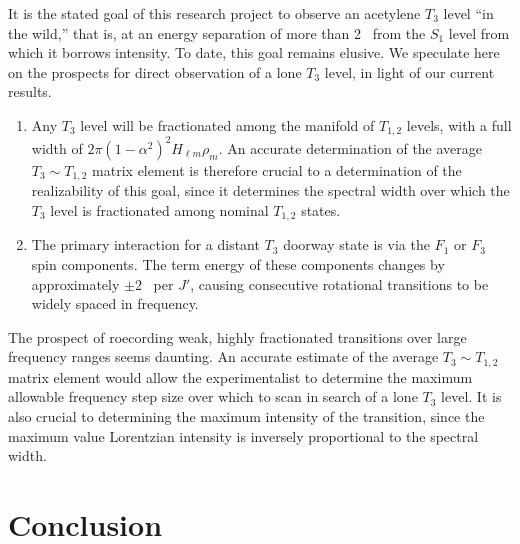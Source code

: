 \documentclass[12pt]{mitthesis}
\begin{document}
It is the stated goal of this research project to observe an acetylene
$T_3$ level ``in the wild,'' that is, at an energy separation of more
than 2 \rcm\ from the $S_1$ level from which it borrows intensity.  To
date, this goal remains elusive.  We speculate here on the prospects
for direct observation of a lone $T_3$ level, in light of our current results.
\begin{enumerate}
\item Any $T_3$ level will be fractionated among the manifold of
  $T_{1,2}$ levels, with a full width of $2 \pi (1-\alpha^2)^2 
  H_{\ell m} \rho_m$. An accurate determination of the average $T_3
  \sim T_{1,2}$ matrix element is therefore crucial to a determination
  of the realizability of this goal, since it determines the spectral
  width over which the $T_3$ level is fractionated among nominal
  $T_{1,2}$ states.
\item The primary interaction for a distant $T_3$ doorway state is via
  the $F_1$ or $F_3$ spin components.  The term energy of these
  components changes by approximately $\pm 2$ \rcm\ per $J'$, causing
  consecutive rotational transitions to be widely spaced in frequency.
\end{enumerate}
The prospect of roecording weak, highly fractionated transitions over
large frequency ranges seems daunting.  An accurate estimate
of the average $T_3 \sim T_{1,2}$ matrix element would allow the
experimentalist to determine the maximum allowable frequency step size over
which to scan in search of a lone $T_3$ level.  It is also crucial to
determining the maximum intensity of the transition, since the maximum
value Lorentzian intensity is inversely proportional to the spectral width.


\section{Conclusion}





\end{document}
